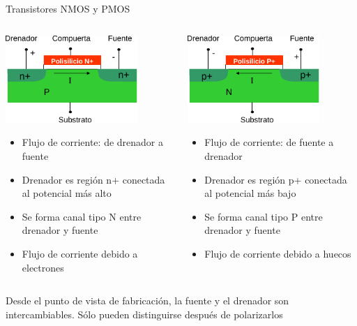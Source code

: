 \documentclass[t,aspectratio=169,10pt]{beamer}
\begin{document}
\begin{frame}{Transistores NMOS y PMOS}
	\begin{columns}
		\begin{column}{0.5\textwidth}
			\centering
			\includegraphics[width=5cm]{NMOS}
			
			\raggedright
			\begin{itemize}
				\item Flujo de corriente: de drenador a fuente
				\item Drenador es región n+ conectada al potencial más alto
				\item Se forma canal tipo N entre drenador y fuente
				\item Flujo de corriente debido a electrones
			\end{itemize}
		\end{column}
		\begin{column}{0.5\textwidth}
			\centering
			\includegraphics[width=5cm]{PMOS}
			
			\raggedright
			\begin{itemize}
				\item Flujo de corriente: de fuente a drenador
				\item Drenador es región p+ conectada al potencial más bajo
				\item Se forma canal tipo P entre drenador y fuente
				\item Flujo de corriente debido a huecos
			\end{itemize}
		\end{column}
	\end{columns}

\centering\vspace{2mm}
Desde el punto de vista de fabricación, la fuente y el drenador son intercambiables. Sólo pueden distinguirse después de polarizarlos

\end{frame}
\end{document}
